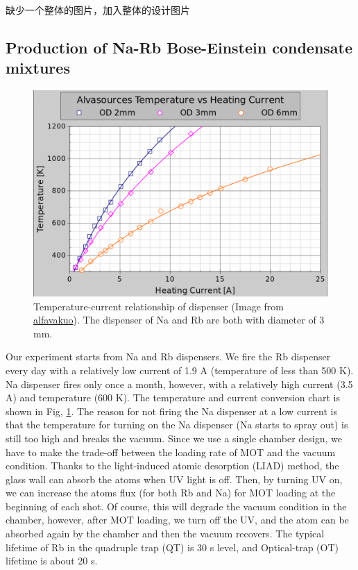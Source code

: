 缺少一个整体的图片，加入整体的设计图片

\subsection{Production of Na-Rb Bose-Einstein condensate mixtures}

\begin{figure}[htb]
\begin{center}
\includegraphics[width = 0.7\linewidth]{figures/Apparatus_dispen.png}
\end{center}
\caption[Temperature-current relationship of dispenser (Image from \href{https://alfavakuo.eu/products/mvs/}{alfavakuo})]{Temperature-current relationship of dispenser (Image from \href{https://alfavakuo.eu/products/mvs/}{alfavakuo}). The dispenser of Na and Rb are both with diameter of 3 mm.}
\label{Apparatus_dispen}
\end{figure}

Our experiment starts from Na and Rb dispensers. We fire the Rb dispenser every day with a relatively low current of 1.9 A (temperature of less than 500 K). Na dispenser fires only once a month, however, with a relatively high current (3.5 A) and temperature (600 K). The temperature and current conversion chart is shown in Fig, \ref{Apparatus_dispen}. The reason for not firing the Na dispenser at a low current is that the temperature for turning on the Na dispenser (Na starts to spray out) is still too high and breaks the vacuum. Since we use a single chamber design, we have to make the trade-off between the loading rate of MOT and the vacuum condition. Thanks to the light-induced atomic desorption (LIAD) method, the glass wall can absorb the atoms when UV light is off. Then, by turning UV on, we can increase the atoms flux (for both Rb and Na) for MOT loading at the beginning of each shot. Of course, this will degrade the vacuum condition in the chamber, however, after MOT loading, we turn off the UV, and the atom can be absorbed again by the chamber and then the vacuum recovers. The typical lifetime of Rb in the quadruple trap (QT) is 30 s level, and Optical-trap (OT) lifetime is about 20 s. 


